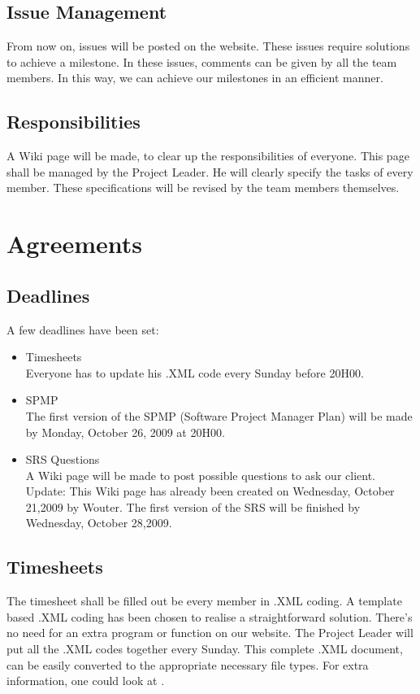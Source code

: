 \documentclass[a4paper, 12pt]{article}
\begin{document}
	\subsection{Issue Management}
	From now on, issues will be posted on the website. These issues require solutions to achieve a milestone. In these issues, comments can be given by all the team members. In this way, we can achieve our milestones in an efficient manner.
	\subsection{Responsibilities}
	A Wiki page will be made, to clear up the responsibilities of everyone. This page shall be managed by the Project Leader. He will clearly specify the tasks of every member. These specifications will be revised by the team members themselves.

	\section{Agreements}
	\subsection{Deadlines}
	A few deadlines have been set:
	
	\begin{itemize}

		\item Timesheets\\
		Everyone has to update his .XML code every Sunday before 20H00.
		\item SPMP\\
		The first version of the SPMP (Software Project Manager Plan) will be made by Monday, October 26, 2009 at 20H00.
		\item SRS Questions\\
		A Wiki page will be made to post possible questions to ask our client. Update: This Wiki page has already been created on Wednesday, October 21,2009 by Wouter\cite{site1}. 		The first version of the SRS will be finished by Wednesday, October 28,2009. 	
	\end{itemize}
	

	\subsection{Timesheets}
	The timesheet shall be filled out be every member in .XML coding. A template based .XML coding has been chosen to realise a straightforward solution. There's no need for an extra program or function on our website. The Project Leader will put all the .XML codes together every Sunday. This complete .XML document, can be easily converted to the appropriate necessary file types. For extra information, one could look at \cite{site2}.
	
\end{document}
